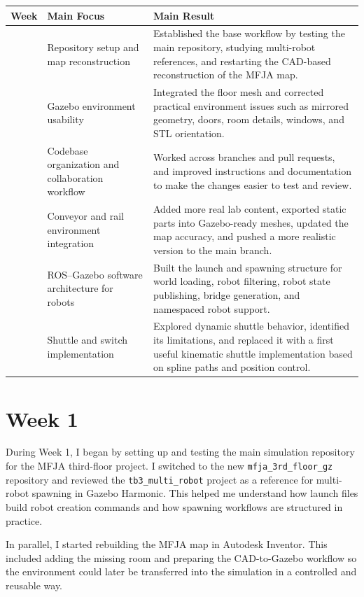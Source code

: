 \documentclass[11pt,a4paper]{article}
\begin{document}
\begin{tabularx}{\textwidth}{>{\raggedright\arraybackslash}p{1.2cm} >{\raggedright\arraybackslash}p{3.4cm} X}
\toprule
\textbf{Week} & \textbf{Main Focus} & \textbf{Main Result} \\
\midrule
1 & Repository setup and map reconstruction & Established the base workflow by testing the main repository, studying multi-robot references, and restarting the CAD-based reconstruction of the MFJA map. \\
\midrule
2 & Gazebo environment usability & Integrated the floor mesh and corrected practical environment issues such as mirrored geometry, doors, room details, windows, and STL orientation. \\
\midrule
3 & Codebase organization and collaboration workflow & Worked across branches and pull requests, and improved instructions and documentation to make the changes easier to test and review. \\
\midrule
4 & Conveyor and rail environment integration & Added more real lab content, exported static parts into Gazebo-ready meshes, updated the map accuracy, and pushed a more realistic version to the main branch. \\
\midrule
5 & ROS--Gazebo software architecture for robots & Built the launch and spawning structure for world loading, robot filtering, robot state publishing, bridge generation, and namespaced robot support. \\
\midrule
6 & Shuttle and switch implementation & Explored dynamic shuttle behavior, identified its limitations, and replaced it with a first useful kinematic shuttle implementation based on spline paths and position control. \\
\bottomrule
\end{tabularx}

\section*{Week 1}

During Week 1, I began by setting up and testing the main simulation repository
for the MFJA third-floor project. I switched to the new
\texttt{mfja\_3rd\_floor\_gz} repository and reviewed the
\texttt{tb3\_multi\_robot} project as a reference for multi-robot spawning in
Gazebo Harmonic. This helped me understand how launch files build robot
creation commands and how spawning workflows are structured in practice.

In parallel, I started rebuilding the MFJA map in Autodesk Inventor. This
included adding the missing room and preparing the CAD-to-Gazebo workflow so
the environment could later be transferred into the simulation in a controlled
and reusable way.
\end{document}

